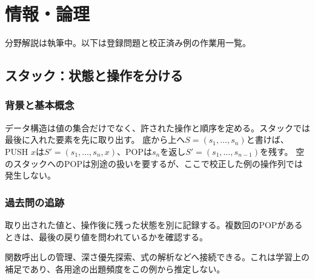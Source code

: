 \chapter{情報・論理}
\noindent 分野解説は執筆中。以下は登録問題と校正済み例の作業用一覧。
\section{スタック：状態と操作を分ける}
\subsection{背景と基本概念}
データ構造は値の集合だけでなく、許された操作と順序を定める。スタックでは最後に入れた要素を先に取り出す。
底から上へ$S=(s_1,\ldots,s_n)$と書けば、PUSH $x$は$S'=(s_1,\ldots,s_n,x)$、POPは$s_n$を返し$S'=(s_1,\ldots,s_{n-1})$を残す。
空のスタックへのPOPは別途の扱いを要するが、ここで校正した例の操作列では発生しない。
\subsection{過去問の追跡}
取り出された値と、操作後に残った状態を別に記録する。複数回のPOPがあるときは、最後の戻り値を問われているかを確認する。
\begin{tcolorbox}[title=情報工学への接続]
関数呼出しの管理、深さ優先探索、式の解析などへ接続できる。これは学習上の補足であり、各用途の出題頻度をこの例から推定しない。
\end{tcolorbox}


